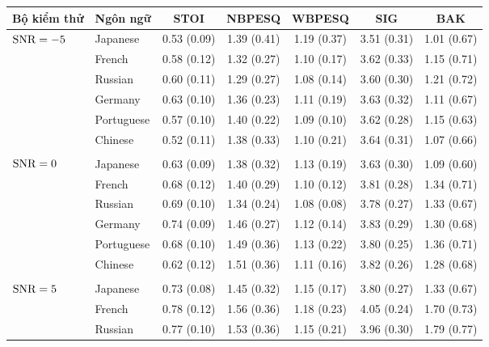 		\begin{table}[h]
			\centering
			\begin{tabular}{l l c c c c c}
				\hline
				\multicolumn{1}{c}{\textbf{Bộ kiểm thử}}	& \multicolumn{1}{c}{\textbf{Ngôn ngữ}}	& \textbf{STOI}	& \textbf{NBPESQ}	& \textbf{WBPESQ}	& \textbf{SIG}	& \textbf{BAK} \\
				\hline
				\multirow{6}{*}{$\text{SNR}=-5$}        & Japanese       & 0.53 (0.09)   & 1.39 (0.41)   & 1.19 (0.37)   & 3.51 (0.31)   & 1.01 (0.67) \\
				& French       & 0.58 (0.12)   & 1.32 (0.27)   & 1.10 (0.17)   & 3.62 (0.33)   & 1.15 (0.71) \\
				& Russian        & 0.60 (0.11)   & 1.29 (0.27)   & 1.08 (0.14)   & 3.60 (0.30)   & 1.21 (0.72) \\
				& Germany        & 0.63 (0.10)   & 1.36 (0.23)   & 1.11 (0.19)   & 3.63 (0.32)   & 1.11 (0.67) \\
				& Portuguese       & 0.57 (0.10)   & 1.40 (0.22)   & 1.09 (0.10)   & 3.62 (0.28)   & 1.15 (0.63) \\
				& Chinese        & 0.52 (0.11)   & 1.38 (0.33)   & 1.10 (0.21)   & 3.64 (0.31)   & 1.07 (0.66) \\
				&&&&&&\\
				\multirow{6}{*}{$\text{SNR}=0$}         & Japanese       & 0.63 (0.09)   & 1.38 (0.32)   & 1.13 (0.19)   & 3.63 (0.30)   & 1.09 (0.60) \\
				& French       & 0.68 (0.12)   & 1.40 (0.29)   & 1.10 (0.12)   & 3.81 (0.28)   & 1.34 (0.71) \\
				& Russian        & 0.69 (0.10)   & 1.34 (0.24)   & 1.08 (0.08)   & 3.78 (0.27)   & 1.33 (0.67) \\
				& Germany        & 0.74 (0.09)   & 1.46 (0.27)   & 1.12 (0.14)   & 3.83 (0.29)   & 1.30 (0.68) \\
				& Portuguese       & 0.68 (0.10)   & 1.49 (0.36)   & 1.13 (0.22)   & 3.80 (0.25)   & 1.36 (0.71) \\
				& Chinese        & 0.62 (0.12)   & 1.51 (0.36)   & 1.11 (0.16)   & 3.82 (0.26)   & 1.28 (0.68) \\
				&&&&&&\\
				\multirow{6}{*}{$\text{SNR}=5$}         & Japanese       & 0.73 (0.08)   & 1.45 (0.32)   & 1.15 (0.17)   & 3.80 (0.27)   & 1.33 (0.67) \\
				& French       & 0.78 (0.12)   & 1.56 (0.36)   & 1.18 (0.23)   & 4.05 (0.24)   & 1.70 (0.73) \\
				& Russian        & 0.77 (0.10)   & 1.53 (0.36)   & 1.15 (0.21)   & 3.96 (0.30)   & 1.79 (0.77) \\

\end{tabular}
\end{table}
